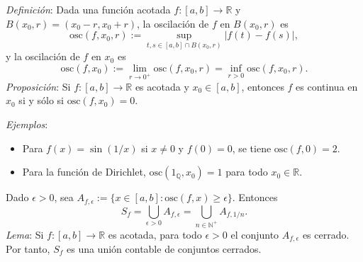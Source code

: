 \documentclass{beamer}
\begin{document}
  \begin{frame}
    \textit{Definición}: Dada una función acotada $f: [a, b] \to \mathbb{R}$ y 
    $B(x_0, r) = (x_0 - r, x_0 + r)$, la oscilación de $f$ en $B(x_0, r)$ es
    \[
      \mathrm{osc}(f, x_0, r) := \sup_{t, s \in [a, b] \cap B(x_0, r)} |f(t) - f(s)|,
    \]
    y la oscilación de $f$ en $x_0$ es
    \[
      \mathrm{osc}(f, x_0) := \lim_{r \to 0^+} \mathrm{osc}(f, x_0, r) = \inf_{r > 0} \mathrm{osc}(f, x_0, r).
    \]
    \pause
    \textit{Proposición}: Si $f: [a, b] \to \mathbb{R}$ es acotada y $x_0 \in [a, b]$, 
    entonces $f$ es continua en $x_0$ si y sólo si $\mathrm{osc}(f, x_0) = 0$.
  \end{frame}

  \begin{frame}
    \textit{Ejemplos}:
    \begin{itemize}[<+->]
      \item Para $f(x) = \sin(1/x)$ si $x \neq 0$ y $f(0) = 0$, se tiene $\mathrm{osc}(f, 0) = 2$.
      \item Para la función de Dirichlet, $\mathrm{osc}(1_{\mathbb{Q}}, x_0) = 1$ para todo 
      $x_0 \in \mathbb{R}$.
    \end{itemize}
    \pause
    \vspace{3mm}
    Dado $\epsilon > 0$, sea $A_{f, \epsilon} := \{x \in [a, b] : \mathrm{osc}(f, x) \geq \epsilon\}$. Entonces
    \[
      S_f = \bigcup_{\epsilon > 0} A_{f, \epsilon} = \bigcup_{n \in \mathbb{N}^+} A_{f, 1/n}.
    \]
    \pause
    \textit{Lema}: Si $f: [a, b] \to \mathbb{R}$ es acotada, para todo $\epsilon > 0$ el 
    conjunto $A_{f, \epsilon}$ es cerrado. Por tanto, $S_f$ es una unión contable de 
    conjuntos cerrados.
  \end{frame}
\end{document}
